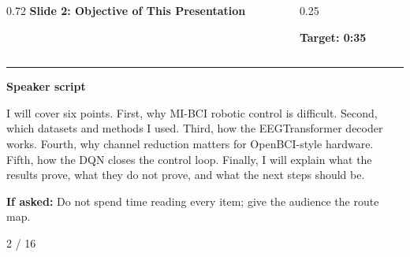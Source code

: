 \documentclass[aspectratio=169,10pt]{beamer}
\begin{document}
\begin{frame}[plain]
\vspace*{0.16cm}
\begin{columns}[T,totalwidth=\textwidth]
\begin{column}{0.72\textwidth}
{\fontsize{17}{18.5}\selectfont\bfseries Slide 2: Objective of This Presentation}
\end{column}
\begin{column}{0.25\textwidth}
\raggedleft
\colorbox{noteCream}{\parbox{0.88\linewidth}{\centering\bfseries Target: 0:35}}
\end{column}
\end{columns}
\vspace{0.10cm}
{\color{uomPurple}\rule{\textwidth}{1.2pt}}
\vspace{0.18cm}
{\color{uomPurple}\bfseries Speaker script}
\vspace{0.06cm}
\setlength{\fboxsep}{6pt}
\noindent\colorbox{panelGrey}{\begin{minipage}{0.94\textwidth}
\justifying\fontsize{11.0}{13.4}\selectfont
I will cover six points. First, why MI-BCI robotic control is difficult. Second, which datasets and methods I used. Third, how the EEGTransformer decoder works. Fourth, why channel reduction matters for OpenBCI-style hardware. Fifth, how the DQN closes the control loop. Finally, I will explain what the results prove, what they do not prove, and what the next steps should be.
\end{minipage}}
\vspace{0.22cm}
\noindent\colorbox{noteCream}{\begin{minipage}{0.94\textwidth}
\fontsize{9.6}{11.6}\selectfont
{\bfseries If asked:} Do not spend time reading every item; give the audience the route map.
\end{minipage}}
\vfill
\hfill{\color{textDark}\scriptsize 2 / 16}
\end{frame}
\end{document}
